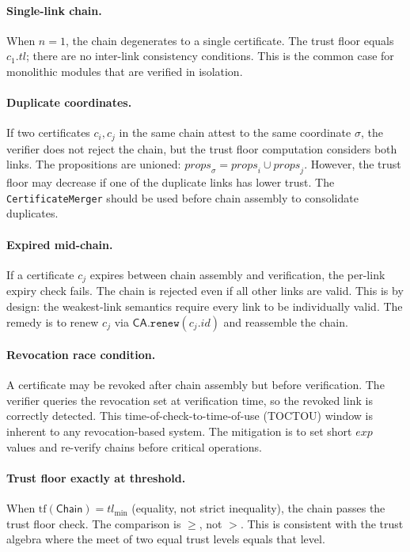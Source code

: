 \documentclass[11pt]{article}
\newcommand{\Chain}{\mathsf{Chain}}            %
\newcommand{\CA}{\mathsf{CA}}                  %
\newcommand{\certid}{\mathit{id}}              %
\newcommand{\certprops}{\mathit{props}}        %
\newcommand{\certtrust}{\mathit{tl}}           %
\newcommand{\certexpiry}{\mathit{exp}}         %
\begin{document}
\paragraph{Single-link chain.}
When $n = 1$, the chain degenerates to a single certificate.
The trust floor equals $c_1.\certtrust$; there are no inter-link
consistency conditions.  This is the common case for monolithic
modules that are verified in isolation.

\paragraph{Duplicate coordinates.}
If two certificates $c_i, c_j$ in the same chain attest to the same
coordinate $\sigma$, the verifier does not reject the chain, but the
trust floor computation considers both links.  The propositions are
unioned: $\certprops_{\sigma} = \certprops_i \cup \certprops_j$.
However, the trust floor may decrease if one of the duplicate links
has lower trust.  The \texttt{CertificateMerger} should be used before
chain assembly to consolidate duplicates.

\paragraph{Expired mid-chain.}
If a certificate $c_j$ expires between chain assembly and verification,
the per-link expiry check fails.  The chain is rejected even if all
other links are valid.  This is by design: the weakest-link semantics
require every link to be individually valid.  The remedy is to renew
$c_j$ via $\CA.\texttt{renew}(c_j.\certid)$ and reassemble the chain.

\paragraph{Revocation race condition.}
A certificate may be revoked after chain assembly but before verification.
The verifier queries the revocation set at verification time, so the
revoked link is correctly detected.  This time-of-check-to-time-of-use
(TOCTOU) window is inherent to any revocation-based system.  The
mitigation is to set short $\certexpiry$ values and re-verify chains
before critical operations.

\paragraph{Trust floor exactly at threshold.}
When $\mathrm{tf}(\Chain) = \certtrust_{\min}$ (equality, not strict
inequality), the chain passes the trust floor check.  The comparison
is $\ge$, not $>$.  This is consistent with the \JuGeo{} trust algebra
where the meet of two equal trust levels equals that level.
\end{document}

